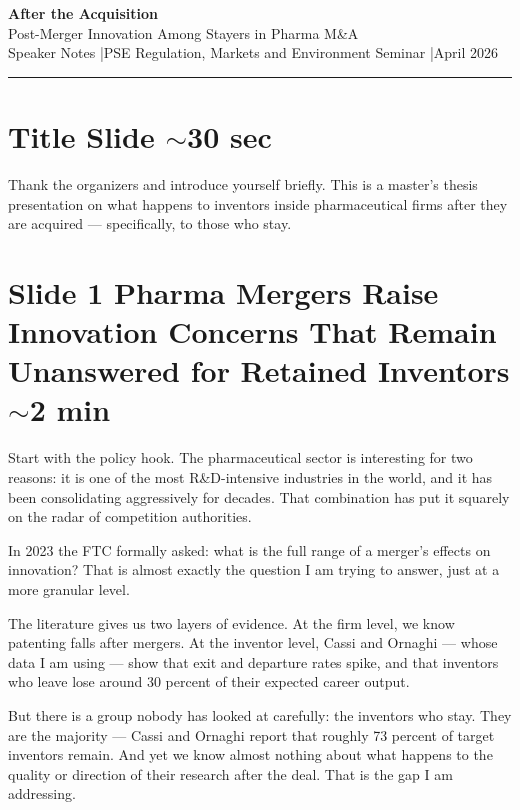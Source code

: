 \documentclass[11pt,a4paper]{article}
\begin{document}
{\Large\bfseries\color{darkblue} After the Acquisition}\\[0.3em]
{\large Post-Merger Innovation Among Stayers in Pharma M\&A}\\[0.2em]
{\color{midgray} Speaker Notes \quad|\quad PSE Regulation, Markets and Environment Seminar \quad|\quad April 2026}

\vspace{1em}
\textcolor{darkblue!30}{\hrule}
\vspace{1.2em}

\section*{Title Slide \hfill{\normalfont\small\color{midgray}$\sim$30 sec}}

Thank the organizers and introduce yourself briefly. This is a master's thesis presentation on what happens to inventors inside pharmaceutical firms after they are acquired --- specifically, to those who stay.

\section*{Slide 1 \quad Pharma Mergers Raise Innovation Concerns That Remain Unanswered for Retained Inventors \hfill{\normalfont\small\color{midgray}$\sim$2 min}}

Start with the policy hook. The pharmaceutical sector is interesting for two reasons: it is one of the most R\&D-intensive industries in the world, and it has been consolidating aggressively for decades. That combination has put it squarely on the radar of competition authorities.

In 2023 the FTC formally asked: what is the full range of a merger's effects on innovation? That is almost exactly the question I am trying to answer, just at a more granular level.

The literature gives us two layers of evidence. At the firm level, we know patenting falls after mergers. At the inventor level, Cassi and Ornaghi --- whose data I am using --- show that exit and departure rates spike, and that inventors who leave lose around 30 percent of their expected career output.

But there is a group nobody has looked at carefully: the inventors who stay. They are the majority --- Cassi and Ornaghi report that roughly 73 percent of target inventors remain. And yet we know almost nothing about what happens to the quality or direction of their research after the deal. That is the gap I am addressing.
\end{document}
